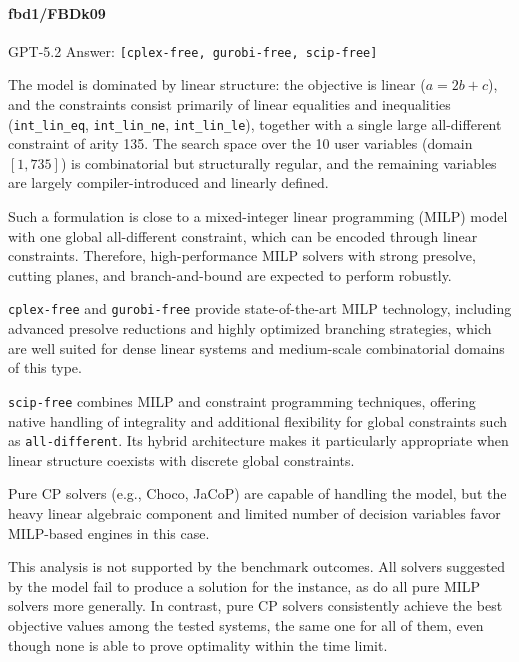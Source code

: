 \documentclass[../../main]{subfiles}
\begin{document}
\paragraph{fbd1/FBDk09}
\begin{floatingdefinition}{GPT-5.2 Answer:}
    \texttt{[cplex-free, gurobi-free, scip-free]}

    The model is dominated by linear structure: the objective is linear ($a = 2b + c$), and the constraints consist primarily of linear equalities and inequalities (\texttt{int\_lin\_eq}, \texttt{int\_lin\_ne}, \texttt{int\_lin\_le}), together with a single large all-different constraint of arity 135. The search space over the 10 user variables (domain $[1,735]$) is combinatorial but structurally regular, and the remaining variables are largely compiler-introduced and linearly defined.

    Such a formulation is close to a mixed-integer linear programming (MILP) model with one global all-different constraint, which can be encoded through linear constraints. Therefore, high-performance MILP solvers with strong presolve, cutting planes, and branch-and-bound are expected to perform robustly.

    \texttt{cplex-free} and \texttt{gurobi-free} provide state-of-the-art MILP technology, including advanced presolve reductions and highly optimized branching strategies, which are well suited for dense linear systems and medium-scale combinatorial domains of this type.

    \texttt{scip-free} combines MILP and constraint programming techniques, offering native handling of integrality and additional flexibility for global constraints such as \texttt{all-different}. Its hybrid architecture makes it particularly appropriate when linear structure coexists with discrete global constraints.

    Pure CP solvers (e.g., Choco, JaCoP) are capable of handling the model, but the heavy linear algebraic component and limited number of decision variables favor MILP-based engines in this case.
\end{floatingdefinition}

This analysis is not supported by the benchmark outcomes. All solvers suggested by the model fail to produce a solution for the instance, as do all pure MILP solvers more generally. In contrast, pure CP solvers consistently achieve the best objective values among the tested systems, the same one for all of them, even though none is able to prove optimality within the time limit.
\end{document}
